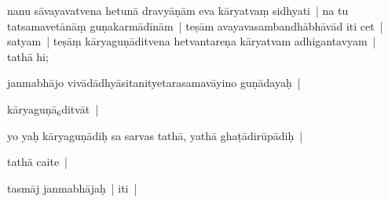 \documentclass[article,12pt,a4paper]{memoir}%
\newcounter{parCount}
\begin{document}
	  
	  \pstart \leavevmode%
	\label{thakur75-33.10}nanu sāvayavatvena hetunā dravyāṇām eva kāryatvaṃ sidhyati | na tu tatsamavetānāṃ guṇakarmādīnām | teṣām avayavasambandhābhāvād iti cet | satyam | teṣāṃ kāryaguṇāditvena hetvantareṇa kāryatvam adhigantavyam | tathā hi; 
	{}
	\pend%
      

	  
	  \pstart \leavevmode%
	\label{ratnakīrtinibandhāvali__36r1N2TBG7ZYEY3S6IFYN6DJ3LW}janmabhājo vivādādhyāsitanityetarasamavāyino guṇādayaḥ |
	{}
	\pend%
      

	  
	  \pstart \leavevmode%
	kāryaguṇā{\tiny $_{6}$}ditvāt |
	{}
	\pend%
      

	  
	  \pstart \leavevmode%
	yo yaḥ kāryaguṇādiḥ sa sarvas tathā, yathā ghaṭādirūpādiḥ |
	{}
	\pend%
      

	  
	  \pstart \leavevmode%
	tathā caite |
	{}
	\pend%
      

	  
	  \pstart \leavevmode%
	tasmāj janmabhājaḥ | iti |
	{}
	\pend%
      
\end{document}
